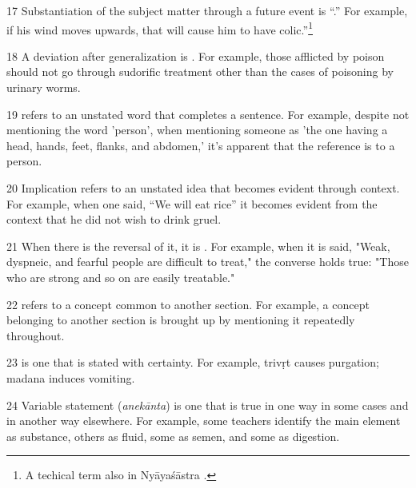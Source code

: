 \begin{translation}
\item [17] Substantiation of the subject matter through a future event is
“.” For example, if his wind moves upwards, that
will cause him to have colic.”\footnote{A techical term also in
    Nyāyaśāstra \citep[6--7]{jhal-1978}.}


\item [18] A deviation after generalization is . For 
example, those afflicted by poison should not go through sudorific treatment 
other 
than the cases of poisoning by urinary worms.

\item [19]  refers to an 
unstated word that 
completes a sentence. For example, despite not mentioning the word 'person',
when mentioning someone as 'the one having a head, hands, feet, flanks, and 
abdomen,' it's apparent that the reference is to a person. 

\item [20] Implication refers to an unstated idea 
that becomes evident through context. For example, when one said, “We will 
eat rice” it becomes evident from the context that he did not wish to drink 
gruel. 

\item [21] When there is the reversal of it, it is . 
For example, when it is said, "Weak, dyspneic, and fearful people are difficult to 
treat," the converse holds true: "Those who are strong and so on are easily 
treatable." 

\item [22]  refers to a concept common to 
another section. For example, a concept belonging to another section is brought 
up 
by mentioning it repeatedly throughout. 

\item [23]  is one that 
is stated with certainty. For example, \gls{trivṛt} causes purgation; 
\gls{madana} induces vomiting.

\item [24] Variable statement (\emph{anekānta}) is one that is true in one way in 
some cases and in another way elsewhere. For example, some teachers identify 
the main element as substance, others as fluid, some as semen, and some as 
digestion.


\end{translation}
